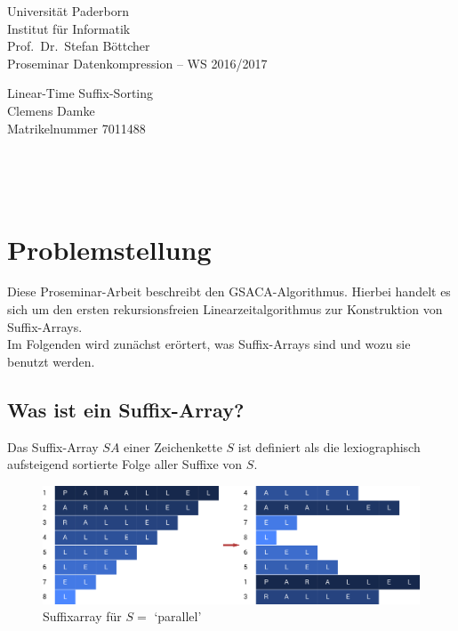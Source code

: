 \documentclass[twoside,11pt]{article}
\theoremstyle{break}
\begin{document}
\pagestyle{empty}

\begin{center}
	\sffamily
    Universität Paderborn \\
    Institut für Informatik \\
    Prof.\ Dr.\ Stefan Böttcher\\[2ex]
    \Large Proseminar Datenkompression – WS 2016/2017

	\vspace*{\fill}
	\Huge \textcolor{blau}{Linear-Time Suffix-Sorting} \\[1ex]
    \LARGE Clemens Damke \\[1ex]
    \Large Matrikelnummer 7011488
	\vspace*{\fill}
\end{center}

\newpage
\
\newpage

\pagestyle{fancy}
\tableofcontents

\newpage
\pagestyle{empty}
\
\newpage
\pagestyle{fancy}

\section{Problemstellung}

Diese Proseminar-Arbeit beschreibt den GSACA-Algorithmus. Hierbei handelt es sich um den ersten rekursionsfreien Linearzeitalgorithmus zur Konstruktion von Suffix-Arrays. \\

Im Folgenden wird zunächst erörtert, was Suffix-Arrays sind und wozu sie benutzt werden.

\subsection{Was ist ein Suffix-Array?}

Das Suffix-Array $SA$ einer Zeichenkette $S$ ist definiert als die lexiographisch aufsteigend sortierte Folge aller Suffixe von $S$.

\begin{figure}[h]
	\centering
	\includegraphics[width=\linewidth,bb=0 0 1474 462]{./assets/whatIsASuffixArray.pdf}
	\caption{Suffixarray für $S =$ `parallel'}
\label{fig:whatIsASuffixArray}
\end{figure}
\end{document}
